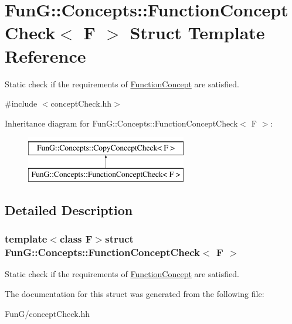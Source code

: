 \hypertarget{structFunG_1_1Concepts_1_1FunctionConceptCheck}{\section{Fun\-G\-:\-:Concepts\-:\-:Function\-Concept\-Check$<$ F $>$ Struct Template Reference}
\label{structFunG_1_1Concepts_1_1FunctionConceptCheck}
}


Static check if the requirements of \hyperlink{structFunG_1_1Concepts_1_1FunctionConcept}{Function\-Concept} are satisfied.  




{\ttfamily \#include $<$concept\-Check.\-hh$>$}

Inheritance diagram for Fun\-G\-:\-:Concepts\-:\-:Function\-Concept\-Check$<$ F $>$\-:\begin{figure}[H]
\begin{center}
\leavevmode
\includegraphics[height=2.000000cm]{structFunG_1_1Concepts_1_1FunctionConceptCheck}
\end{center}
\end{figure}


\subsection{Detailed Description}
\subsubsection*{template$<$class F$>$struct Fun\-G\-::\-Concepts\-::\-Function\-Concept\-Check$<$ F $>$}

Static check if the requirements of \hyperlink{structFunG_1_1Concepts_1_1FunctionConcept}{Function\-Concept} are satisfied. 

The documentation for this struct was generated from the following file\-:\begin{DoxyCompactItemize}
\item 
Fun\-G/concept\-Check.\-hh\end{DoxyCompactItemize}
